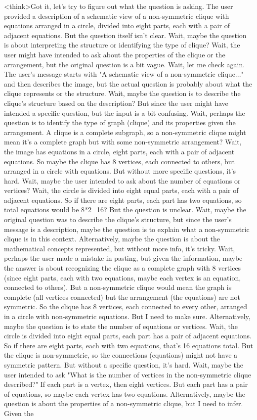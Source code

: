<think>Got it, let's try to figure out what the question is asking. The user provided a description of a schematic view of a non-symmetric clique with equations arranged in a circle, divided into eight parts, each with a pair of adjacent equations. But the question itself isn't clear. Wait, maybe the question is about interpreting the structure or identifying the type of clique? Wait, the user might have intended to ask about the properties of the clique or the arrangement, but the original question is a bit vague. Wait, let me check again. The user's message starts with "A schematic view of a non-symmetric clique..." and then describes the image, but the actual question is probably about what the clique represents or the structure. Wait, maybe the question is to describe the clique's structure based on the description? But since the user might have intended a specific question, but the input is a bit confusing. Wait, perhaps the question is to identify the type of graph (clique) and its properties given the arrangement. A clique is a complete subgraph, so a non-symmetric clique might mean it's a complete graph but with some non-symmetric arrangement? Wait, the image has equations in a circle, eight parts, each with a pair of adjacent equations. So maybe the clique has 8 vertices, each connected to others, but arranged in a circle with equations. But without more specific questions, it's hard. Wait, maybe the user intended to ask about the number of equations or vertices? Wait, the circle is divided into eight equal parts, each with a pair of adjacent equations. So if there are eight parts, each part has two equations, so total equations would be 8*2=16? But the question is unclear. Wait, maybe the original question was to describe the clique's structure, but since the user's message is a description, maybe the question is to explain what a non-symmetric clique is in this context. Alternatively, maybe the question is about the mathematical concepts represented, but without more info, it's tricky. Wait, perhaps the user made a mistake in pasting, but given the information, maybe the answer is about recognizing the clique as a complete graph with 8 vertices (since eight parts, each with two equations, maybe each vertex is an equation, connected to others). But a non-symmetric clique would mean the graph is complete (all vertices connected) but the arrangement (the equations) are not symmetric. So the clique has 8 vertices, each connected to every other, arranged in a circle with non-symmetric equations. But I need to make sure. Alternatively, maybe the question is to state the number of equations or vertices. Wait, the circle is divided into eight equal parts, each part has a pair of adjacent equations. So if there are eight parts, each with two equations, that's 16 equations total. But the clique is non-symmetric, so the connections (equations) might not have a symmetric pattern. But without a specific question, it's hard. Wait, maybe the user intended to ask "What is the number of vertices in the non-symmetric clique described?" If each part is a vertex, then eight vertices. But each part has a pair of equations, so maybe each vertex has two equations. Alternatively, maybe the question is about the properties of a non-symmetric clique, but I need to infer. Given the 